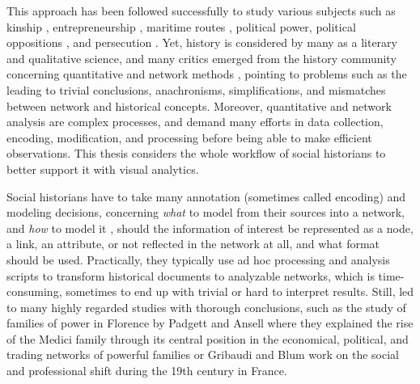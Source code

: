 This approach has been followed successfully to study various subjects such as kinship \cite{hambergerKinshipNetworkAnalysis2011}, entrepreneurship \cite{rubio-mondejarWomenEntrepreneursFamily2022}, maritime routes \cite{larsonThomasTartaronMaritime2014}, political power\cite{padgettRobustActionRise1993}, political oppositions \cite{osaSolidarityContentionNetworks2003}, and persecution \cite{mercklePeutonModeliserPersecution2018}.
Yet, history is considered by many as a literary and qualitative science, and many critics emerged from the history community concerning quantitative and network methods \cite{lepetitHistoireQuantitativeDeux1989, guldiHistoryManifesto2014, karila-cohenNouvellesCuisinesHistoire2018, lemercier12FormalNetwork2015}, pointing to problems such as the leading to trivial conclusions, anachronisms, simplifications, and mismatches between network and historical concepts.
Moreover, quantitative and network analysis are complex processes, and demand many efforts in data collection, encoding, modification, and processing before being able to make efficient observations.
This thesis considers the whole workflow of social historians to better support it with visual analytics.

Social historians have to take many annotation (sometimes called encoding) and modeling decisions, concerning \emph{what} to model from their sources into a network, and \emph{how} to model it \cite{cristofoliAuxSourcesGrands2008, dufournaudRechercheEmpiriqueHistoire2015}, \ie should the information of interest be represented as a node, a link, an attribute, or not reflected in the network at all, and what format should be used.
Practically, they typically use ad hoc processing and analysis scripts to transform historical documents to analyzable networks, which is time-consuming, sometimes to end up with trivial or hard to interpret results\cite{alkadi2022}.
Still, \hsna led to many highly regarded studies with thorough conclusions, such as the study of families of power in Florence by Padgett and Ansell where they explained the rise of the Medici family through its central position in the economical, political, and trading networks of powerful families\cite{padgettRobustActionRise1993} or Gribaudi and Blum work on the social and professional shift during the 19th century in France\cite{gribaudi1990}.

